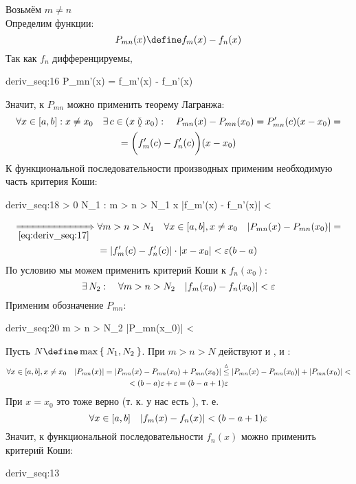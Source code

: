 \begin{iproof}
	\item Возьмём $ m \ne n $ \\
	Определим функции:
	$$ P_{mn}(x) \define f_m(x) - f_n(x) $$
	Так как $ f_n $ дифференцируемы,
	\begin{equ}{deriv_seq:16}
		\exist P_{mn}'(x) = f_m'(x) - f_n'(x)
	\end{equ}
	Значит, к $ P_{mn} $ можно применить теорему Лагранжа:
	\begin{multline}\lbl{deriv_seq:17}
		\forall x \in [a, b] : x \ne x_0 \quad \exist c \in (x \between x_0) : \quad P_{mn}(x) - P_{mn}(x_0) = P_{mn}'(c)(x - x_0) = \\
		= \bigg( f_m'(c) - f_n'(c) \bigg)(x - x_0)
	\end{multline}
	К функциональной последовательности производных применим необходимую часть критерия Коши:
	\begin{equ}{deriv_seq:18}
		\forall \veps > 0 \quad \exist N_1 : \quad \forall m > n > N_1 \quad \forall x \in [a, b] \quad |f_m'(x) - f_n'(x)| < \veps
	\end{equ}
	\begin{multline}\lbl{deriv_seq:19}
		\underimp{\eref{deriv_seq:17}} \forall m > n > N_1 \quad \forall x \in [a, b], x \ne x_0 \quad |P_{mn}(x) - P_{mn}(x_0)| = \\
		= |f_m'(c) - f_n'(c)| \cdot |x - x_0| < \veps (b - a)
	\end{multline}
	По условию  мы можем применить критерий Коши к $ f_n(x_0) $:
	$$ \exists\, N_2 : \quad \forall m > n > N_2 \quad |f_m(x_0) - f_n(x_0)| < \varepsilon $$
	Применим обозначение $ P_{mn} $:
	\begin{equ}{deriv_seq:20}
		\forall m > n > N_2 \quad |P_{mn}(x_0)| < \veps
	\end{equ}
	Пусть $ N \define \max\set{N_1, N_2} $. При $ m > n > N $ действуют и , и :
	\begin{multline*}
		\forall x \in [a, b], x \ne x_0 \quad |P_{mn}(x)| = |P_{mn}(x) - P_{mn}(x_0) + P_{mn}(x_0)| \stackrel\vartriangle\le |P_{mn}(x) - P_{mn}(x_0)| + |P_{mn}(x_0)| < \\
		< (b - a)\varepsilon + \varepsilon = (b - a + 1)\varepsilon
	\end{multline*}
	При $ x = x_0 $ это тоже верно (т. к. у нас есть ), т. е.
	$$ \forall x \in [a, b] \quad |f_m(x) - f_n(x)| < (b - a + 1)\varepsilon $$
	Значит, к функциональной последовательности $ f_n(x) $ можно применить критерий Коши:
	\begin{equ}{deriv_seq:13}

\end{equ}
\end{iproof}
